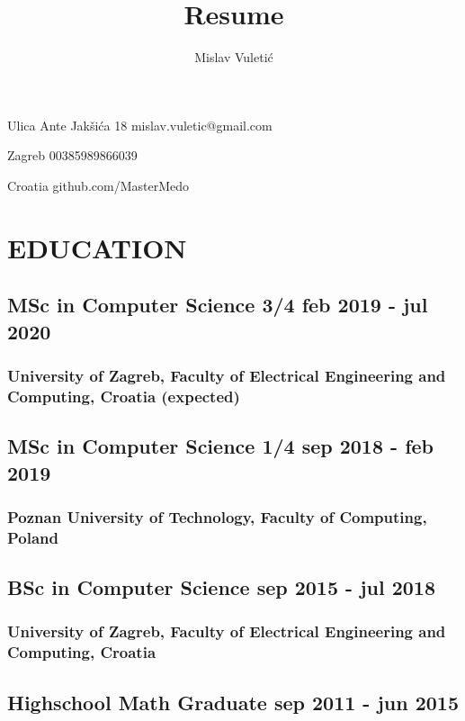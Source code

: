 \documentclass{article}
\begin{document}
\title{Resume}
\author{Mislav Vuletić}

\noindent\Huge\bfseries\theauthor\mdseries\large

\hfill

\hfill

\noindent
Ulica Ante Jakšića 18 \hfill mislav.vuletic@gmail.com

 Zagreb \hfill 00385989866039

\noindent
Croatia \hfill github.com/MasterMedo

\hfill

\section{EDUCATION}

\subsection{MSc in Computer Science 3/4 \hfill feb 2019 - jul 2020}
\subsubsection{University of Zagreb, Faculty of Electrical Engineering and Computing, Croatia \hfill (expected)}

\subsection{MSc in Computer Science 1/4 \hfill sep 2018 - feb 2019}
\subsubsection{Poznan University of Technology, Faculty of Computing, Poland}

\subsection{BSc in Computer Science \hfill sep 2015 - jul 2018}
\subsubsection{University of Zagreb, Faculty of Electrical Engineering and Computing, Croatia}

\subsection{Highschool Math Graduate \hfill sep 2011 - jun 2015}
\end{document}
